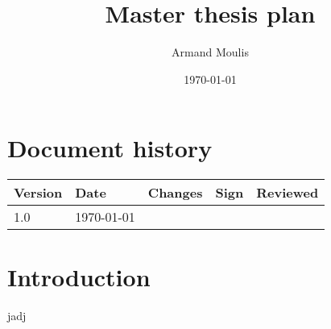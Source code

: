 \documentclass{article}
\begin{document}
	
	
\title{Master thesis plan}
\author{Armand Moulis}
\date{\today}
\maketitle
\newpage


\newpage
\setcounter{tocdepth}{3}
\tableofcontents
\newpage

\section*{Document history}
\begin{center}
	\begin{tabular}{|l|l| p{5cm} |l|l| }
		\hline
		Version & Date   & Changes & Sign & Reviewed \\ \hline
		1.0     & \today &         &      &  \\ \hline
	\end{tabular}
\end{center}

\setcounter{page}{1}
\newpage

\section{Introduction}

jadj \cite{forensic_identification}

	
\newpage

	
	
\end{document}

